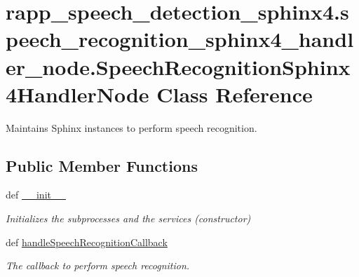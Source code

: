 \hypertarget{classrapp__speech__detection__sphinx4_1_1speech__recognition__sphinx4__handler__node_1_1SpeechRecognitionSphinx4HandlerNode}{\section{rapp\-\_\-speech\-\_\-detection\-\_\-sphinx4.\-speech\-\_\-recognition\-\_\-sphinx4\-\_\-handler\-\_\-node.\-Speech\-Recognition\-Sphinx4\-Handler\-Node Class Reference}
\label{classrapp__speech__detection__sphinx4_1_1speech__recognition__sphinx4__handler__node_1_1SpeechRecognitionSphinx4HandlerNode}
}


Maintains Sphinx instances to perform speech recognition.  


\subsection*{Public Member Functions}
\begin{DoxyCompactItemize}
\item 
def \hyperlink{classrapp__speech__detection__sphinx4_1_1speech__recognition__sphinx4__handler__node_1_1SpeechRecognitionSphinx4HandlerNode_a82c15c573f92e81d51b4d07bdf8d801c}{\-\_\-\-\_\-init\-\_\-\-\_\-}
\begin{DoxyCompactList}\small\item\em Initializes the subprocesses and the services (constructor) \end{DoxyCompactList}\item 
def \hyperlink{classrapp__speech__detection__sphinx4_1_1speech__recognition__sphinx4__handler__node_1_1SpeechRecognitionSphinx4HandlerNode_ab2a5e3c1fb1b126c727ac554147830b1}{handle\-Speech\-Recognition\-Callback}
\begin{DoxyCompactList}\small\item\em The callback to perform speech recognition. \end{DoxyCompactList}\end{DoxyCompactItemize}
